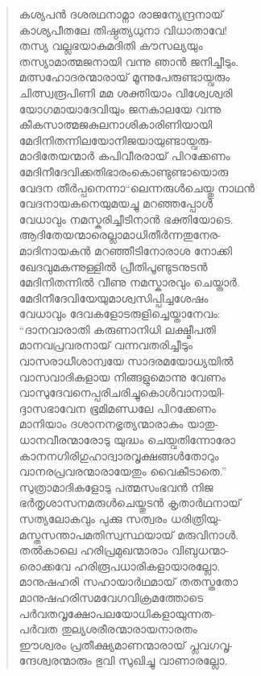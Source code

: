\begin{verse}
കശ്യപന്‍ ദശരഥനാമ്നാ രാജന്യേന്ദ്രനായ്\\
കാശ്യപീതലേ തിഷ്ഠത്യധുനാ വിധാതാവേ!\\
തസ്യ വല്ലഭയാകുമദിതി കൗസല്യയും\\
തസ്യാമാത്മജനായി വന്നു ഞാന്‍ ജനിച്ചീടും.\\
മത്സഹോദരന്മാരായ് മൂന്നുപേരുണ്ടായ്വരും\\
ചിത്സ്വരൂപിണി മമ ശക്തിയാം വിശ്വേശ്വരി\\
യോഗമായാദേവിയും ജനകാലയേ വന്നു\\
കീകസാത്മജകുലനാശികാരിണിയായി\\
മേദിനിതന്നിലയോനിജയായുണ്ടായ്വരു-\\
മാദിതേയന്മാര്‍ കപിവീരരായ് പിറക്കേണം\\
മേദിനീദേവിക്കതിഭാരംകൊണ്ടുണ്ടായൊരു\\
വേദന തീര്‍പ്പനെന്നാ“ലെന്നരുള്‍ചെയ്തു നാഥന്‍\\
വേദനായകനെയുമയച്ചു മറഞ്ഞപ്പോള്‍\\
വേധാവും നമസ്കരിച്ചീടിനാന്‍ ഭക്തിയോടെ.\\
ആദിതേയന്മാരെല്ലാമാധിതീര്‍ന്നതുനേര-\\
മാദിനായകന്‍ മറഞ്ഞീടിനോരാശ നോക്കി\\
ഖേദവുമകന്നുള്ളില്‍ പ്രീതിപൂണ്ടുടനുടന്‍\\
മേദിനിതന്നില്‍ വീണു നമസ്കാരവും ചെയ്താര്‍.\\
മേദിനീദേവിയേയുമാശ്വസിപ്പിച്ചശേഷം\\
വേധാവും ദേവകളോടരുളിച്ചെയ്താനേവം:\\
“ദാനവാരാതി കരുണാനിധി ലക്ഷ്മീപതി\\
മാനവപ്രവരനായ് വന്നവതരിച്ചീടും\\
വാസരാധീശാന്വയേ സാദരമയോധ്യയില്‍\\
വാസവാദികളായ നിങ്ങളുമൊന്നു വേണം\\
വാസുദേവനെപ്പരിചരിച്ചുകൊള്‍വാനായി-\\
ദ്ദാസഭാവേന ഭൂമിമണ്ഡലേ പിറക്കേണം\\
മാനിയാം ദശാനനഭൃത്യന്മാരാകും യാതു-\\
ധാനവീരന്മാരോടു യുദ്ധം ചെയ്വതിന്നോരോ\\
കാനനഗിരിഗുഹാദ്വാരവൃക്ഷങ്ങള്‍തോറും\\
വാനരപ്രവരന്മാരായേതും വൈകീടാതെ.”\\
സുത്രാമാദികളോടു പത്മസംഭവന്‍ നിജ\\
ഭര്‍തൃശാസനമരുള്‍ചെയ്തുടന്‍ കൃതാര്‍ഥനായ്\\
സത്യലോകവും പുക്കു സത്വരം ധരിത്രിയു-\\
മസ്തസന്താപമതിസ്വസ്ഥയായ് മരുവിനാള്‍.\\
തല്‍കാലെ ഹരിപ്രമുഖന്മാരാം വിബുധന്മാ-\\
രൊക്കവേ ഹരിരൂപധാരികളായാരല്ലോ.\\
മാനുഷഹരി സഹായാര്‍ഥമായ് തതസ്തതോ\\
മാനുഷഹരിസമവേഗവിക്രമത്തോടെ\\
പര്‍വതവൃക്ഷോപലയോധികളായുന്നത-\\
പര്‍വത തുല്യശരീരന്മാരായനാരതം\\
ഈശ്വരം പ്രതീക്ഷ്യമാണന്മാരായ് പ്ലവഗവൃ-\\
ന്ദേശ്വരന്മാരും ഭുവി സുഖിച്ചു വാണാരല്ലോ.
\end{verse}


